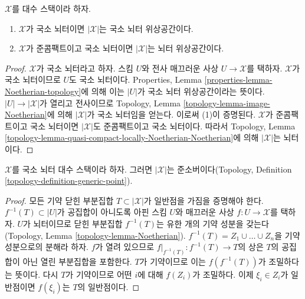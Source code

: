 \begin{lemma}
\label{lemma-Noetherian-topology}
$\mathcal{X}$를 대수 스택이라 하자.
\begin{enumerate}
\item $\mathcal{X}$가 국소 뇌터이면 $|\mathcal{X}|$는 국소 뇌터
위상공간이다.
\item $\mathcal{X}$가 준콤팩트이고 국소 뇌터이면
$|\mathcal{X}|$는 뇌터 위상공간이다.
\end{enumerate}
\end{lemma}

\begin{proof}
$\mathcal{X}$가 국소 뇌터라고 하자. 스킴 $U$와 전사 매끄러운 사상
$U \to \mathcal{X}$를 택하자. $\mathcal{X}$가 국소 뇌터이므로
$U$도 국소 뇌터이다. Properties, Lemma
\ref{properties-lemma-Noetherian-topology}에 의해 이는 $|U|$가 국소 뇌터
위상공간이라는 뜻이다. $|U| \to |\mathcal{X}|$가 열리고 전사이므로
Topology, Lemma \ref{topology-lemma-image-Noetherian}에 의해
$|\mathcal{X}|$가 국소 뇌터임을 얻는다. 이로써 (1)이 증명된다.
$\mathcal{X}$가 준콤팩트이고 국소 뇌터이면 $|\mathcal{X}|$도 준콤팩트이고
국소 뇌터이다. 따라서 Topology, Lemma
\ref{topology-lemma-quasi-compact-locally-Noetherian-Noetherian}에 의해
$|\mathcal{X}|$는 뇌터이다.
\end{proof}

\begin{lemma}
\label{lemma-locally-Noetherian-quasi-sober}
$\mathcal{X}$를 국소 뇌터 대수 스택이라 하자. 그러면
$|\mathcal{X}|$는 준소버이다(Topology, Definition
\ref{topology-definition-generic-point}).
\end{lemma}

\begin{proof}
모든 기약 닫힌 부분집합 $T \subset |\mathcal{X}|$가 일반점을 가짐을
증명해야 한다. $f^{-1}(T) \subset |U|$가 공집합이 아니도록 아핀 스킴
$U$와 매끄러운 사상 $f : U \to \mathcal{X}$를 택하자.
$U$가 뇌터이므로 닫힌 부분집합 $f^{-1}(T)$는 유한 개의 기약 성분을
갖는다(Topology, Lemma \ref{topology-lemma-Noetherian}).
$f^{-1}(T) = Z_1 \cup \ldots \cup Z_n$을 기약 성분으로의 분해라 하자.
$f$가 열려 있으므로 $f|_{f^{-1}(T)} : f^{-1}(T) \to T$의 상은
$T$의 공집합이 아닌 열린 부분집합을 포함한다. $T$가 기약이므로 이는
$f(f^{-1}(T))$가 조밀하다는 뜻이다. 다시 $T$가 기약이므로 어떤 $i$에
대해 $f(Z_i)$가 조밀하다. 이제 $\xi_i \in Z_i$가 일반점이면
$f(\xi_i)$는 $T$의 일반점이다.
\end{proof}





